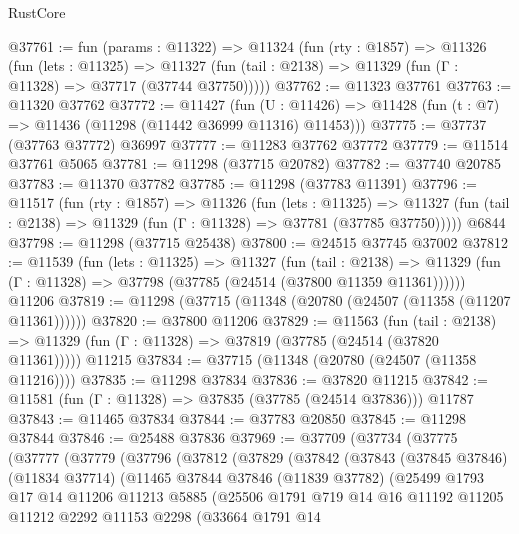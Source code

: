 \begin{lexlean}{RustCore}
\begin{coremodule}
@37761 := fun (params : @11322) =>
  @11324
    (fun (rty : @1857) =>
    @11326
      (fun (lets : @11325) =>
      @11327 (fun (tail : @2138) => @11329 (fun (Γ : @11328) => @37717 (@37744 @37750)))))
@37762 := @11323 @37761
@37763 := @11320 @37762
@37772 := @11427
    (fun (U : @11426) => @11428 (fun (t : @7) => @11436 (@11298 (@11442 @36999 @11316) @11453)))
@37775 := @37737 (@37763 @37772) @36997
@37777 := @11283 @37762 @37772
@37779 := @11514 @37761 @5065
@37781 := @11298 (@37715 @20782)
@37782 := @37740 @20785
@37783 := @11370 @37782
@37785 := @11298 (@37783 @11391)
@37796 := @11517
    (fun (rty : @1857) =>
    @11326
      (fun (lets : @11325) =>
      @11327 (fun (tail : @2138) => @11329 (fun (Γ : @11328) => @37781 (@37785 @37750)))))
    @6844
@37798 := @11298 (@37715 @25438)
@37800 := @24515 @37745 @37002
@37812 := @11539
    (fun (lets : @11325) =>
    @11327
      (fun (tail : @2138) =>
      @11329 (fun (Γ : @11328) => @37798 (@37785 (@24514 (@37800 @11359 @11361))))))
    @11206
@37819 := @11298 (@37715 (@11348 (@20780 (@24507 (@11358 (@11207 @11361))))))
@37820 := @37800 @11206
@37829 := @11563
    (fun (tail : @2138) => @11329 (fun (Γ : @11328) => @37819 (@37785 (@24514 (@37820 @11361)))))
    @11215
@37834 := @37715 (@11348 (@20780 (@24507 (@11358 @11216))))
@37835 := @11298 @37834
@37836 := @37820 @11215
@37842 := @11581 (fun (Γ : @11328) => @37835 (@37785 (@24514 @37836))) @11787
@37843 := @11465 @37834
@37844 := @37783 @20850
@37845 := @11298 @37844
@37846 := @25488 @37836
@37969 := @37709
    (@37734
      (@37775
        (@37777
          (@37779
            (@37796
              (@37812
                (@37829
                  (@37842
                    (@37843
                      (@37845 @37846)
                      (@11834 @37714)
                      (@11465
                        @37844
                        @37846
                        (@11839 @37782)
                        (@25499
                          @1793
                          @17
                          @14
                          @11206
                          @11213
                          @5885
                          (@25506
                            @1791
                            @719
                            @14
                            @16
                            @11192
                            @11205
                            @11212
                            @2292
                            @11153
                            @2298
                            (@33664
                              @1791
                              @14

\end{coremodule}
\end{lexlean}
